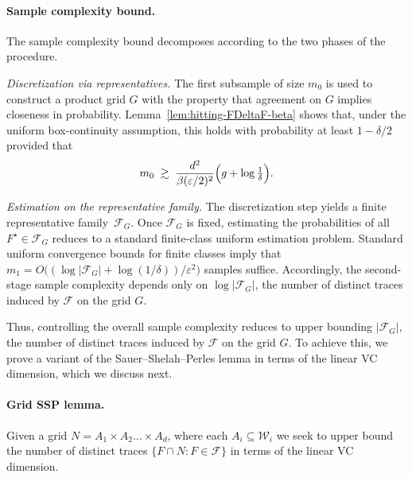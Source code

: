\documentclass[arxiv]{colt2026}
\newcommand{\F}{\mathcal{F}}
\newcommand{\W}{\mathcal{W}}
\newcommand{\eps}{\varepsilon}
\begin{document}
\paragraph{Sample complexity bound. }
The sample complexity bound decomposes according to the two phases of the
procedure.

\noindent \emph{Discretization via representatives. }
The first subsample of size $m_0$ is used to construct a product grid $G$ with
the property that agreement on $G$ implies closeness in probability.
Lemma~\ref{lem:hitting-FDeltaF-beta} shows that, under the uniform
box-continuity assumption, this holds with probability at least $1-\delta/2$
provided that
\[
m_0 \;\gtrsim\;
\frac{d^2}{\beta(\eps/2)^2}
\Bigl(g+\log\tfrac{1}{\delta}\Bigr).
\]

\noindent \emph{Estimation on the representative family. }
The discretization step yields a finite representative family~$\F_G$.
Once $\F_G$ is fixed, estimating the probabilities of all
$F^\star\in\F_G$ reduces to a standard finite-class uniform estimation problem.
Standard uniform convergence bounds for finite classes imply that
$m_1 = O\!\bigl((\log|\F_G|+\log(1/\delta))/\eps^2\bigr)$ samples suffice.
Accordingly, the second-stage sample complexity depends only on
$\log|\F_G|$, the number of distinct traces induced by $\F$ on the grid $G$.


Thus, controlling the overall sample complexity reduces to upper bounding
$|\F_G|$, the number of distinct traces induced by $\F$ on the grid $G$.
{To achieve this, we prove a variant of the Sauer–Shelah–Perles lemma
\citep{sauer1972,shelah1972} in terms of the linear VC dimension, which we discuss next. }




\paragraph{Grid SSP lemma.}
Given a grid $N=A_1\times A_2\ldots\times A_d$, where each $A_i\subseteq\W_i$ we seek to upper bound the number of distinct traces
$\{F\cap N : F\in\F\}$ in terms of the linear VC dimension.
\end{document}
